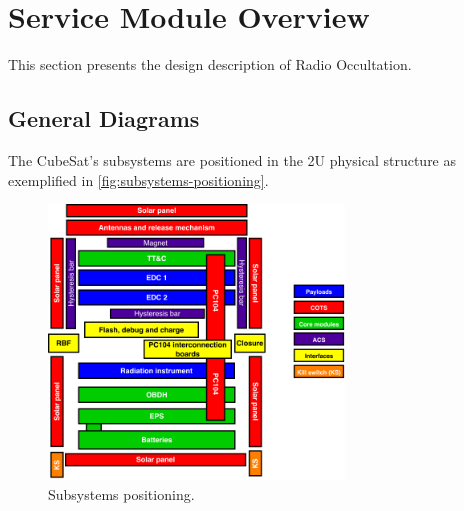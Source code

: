 %
%
%
%
%

%
%
%
%
%
%

\chapter{Service Module Overview} \label{ch:design}

This section presents the design description of Radio Occultation.

\section{General Diagrams}

The CubeSat's subsystems are positioned in the 2U physical structure as exemplified in \autoref{fig:subsystems-positioning}. 

\begin{figure}[!htb]
    \begin{center}
        \includegraphics[width=0.7\textwidth]{figures/subsystems-positioning.pdf}
        \caption{Subsystems positioning.}
        \label{fig:subsystems-positioning}
    \end{center}
\end{figure}

